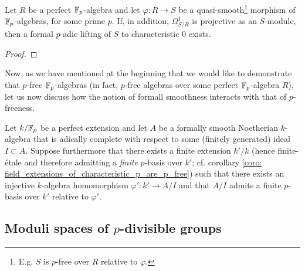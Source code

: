             \begin{proposition} \label{prop: existence_of_lifts_of_quasi_smooth_rings_of_characteristic_p}
                Let $R$ be a perfect $\mathbb{F}_p$-algebra and let $\varphi: R \to S$ be a quasi-smooth\footnote{E.g. $S$ is $p$-free over $R$ relative to $\varphi$.} morphism of $\mathbb{F}_p$-algebras, for some prime $p$. If, in addition, $\Omega^1_{S/R}$ is projective as an $S$-module, then a formal $p$-adic lifting of $S$ to characteristic $0$ exists. 
            \end{proposition}
                \begin{proof}
                    
                \end{proof}
            
            Now, as we have mentioned at the beginning that we would like to demonstrate that $p$-free $\mathbb{F}_p$-algebras (in fact, $p$-free algebras over some perfect $\mathbb{F}_p$-algebra $R$), let us now discuss how the notion of formall smoothness interacts with that of $p$-freeness.
            \begin{convention}
                Let $k/\mathbb{F}_p$ be a perfect extension and let $A$ be a formally smooth Noetherian $k$-algebra that is adically complete with respect to some (finitely generated) ideal $I \subset A$. Suppose furthermore that there exists a finite extension $k'/k$ (hence finite-\'etale and therefore admitting a \textit{finite} $p$-basis over $k'$; cf. corollary \ref{coro: field_extensions_of_characteristic_p_are_p_free}) such that there exists an injective $k$-algebra homomorphism $\varphi': k' \to A/I$ and that $A/I$ admits a finite $p$-basis over $k'$ relative to $\varphi'$.
            \end{convention}
    
    \subsection{Moduli spaces of \texorpdfstring{$p$}{}-divisible groups}
